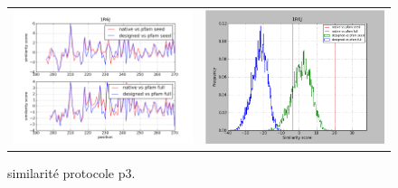 \documentclass[a4paper,12pt]{article}
\begin{document}
   \begin{figure}[t]
     \centering
     \begin{tabular}{cc}
       \includegraphics[width=8.45cm]{gen_08032012/1R6J/p3/graph_simil_bypos.png} &
       \includegraphics[width=8.45cm]{gen_08032012/1R6J/p3/graph_simil_byseq.png} \\

     \end{tabular}

     \caption{similarité protocole p3.}
   \end{figure}
\end{document}
